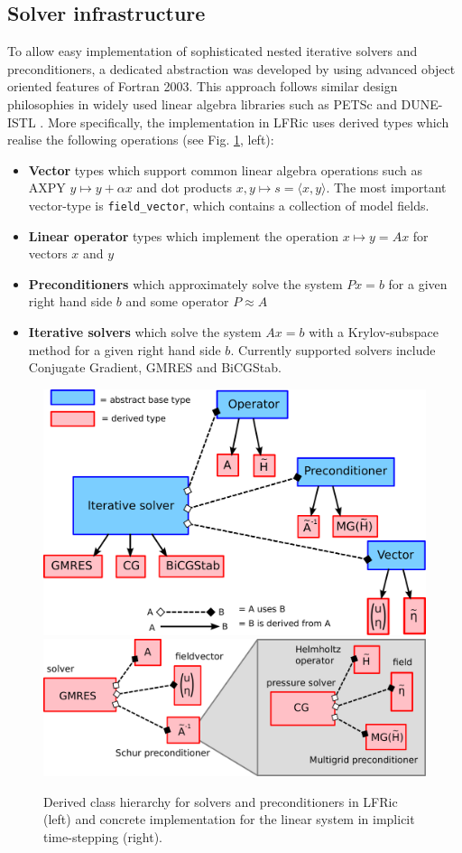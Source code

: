 \documentclass[review,times]{elsarticle}
\begin{document}
\subsection{Solver infrastructure}
To allow easy implementation of sophisticated nested iterative solvers
and preconditioners, a dedicated abstraction was developed by using
advanced object oriented features of Fortran 2003. This approach
follows similar design philosophies in widely used linear algebra
libraries such as PETSc \cite{Balay1997,Balay2018} and DUNE-ISTL
\cite{Blatt2007}. More specifically, the implementation in LFRic uses
derived types which realise the following operations (see
Fig. \ref{fig:class_hierarchy}, left):
\begin{itemize}
\item \textbf{Vector} types which support common linear algebra
  operations such as AXPY $y\mapsto y+\alpha x$ and dot products
  $x,y\mapsto s = \langle x,y\rangle$. The most important vector-type
  is \texttt{field\_vector}, which contains a collection of model
  fields.
\item \textbf{Linear operator} types which implement the operation $x\mapsto y=Ax$ for vectors $x$ and $y$
\item \textbf{Preconditioners} which approximately solve the system $Px=b$ for a
  given right hand side $b$ and some operator $P\approx A$
\item \textbf{Iterative solvers} which solve the system $Ax=b$ with a
  Krylov-subspace method for a given right hand side $b$. Currently
  supported solvers include Conjugate Gradient, GMRES and BiCGStab.
\end{itemize}
\begin{figure}
  \begin{center}
    \includegraphics[width=0.45\linewidth]{class_hierarchy.pdf}
    \hfill
    \includegraphics[width=0.45\linewidth]{class_concrete.pdf}
    \caption{Derived class hierarchy for solvers and preconditioners
      in LFRic (left) and concrete implementation for the linear
      system in implicit time-stepping (right).}
    \label{fig:class_hierarchy}
  \end{center}
\end{figure}
\end{document}

